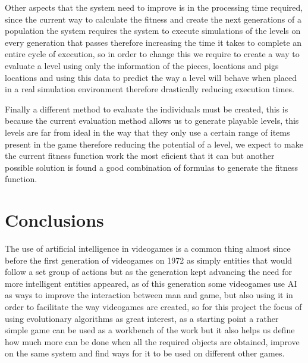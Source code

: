 \documentclass[conference]{IEEEtran}
\begin{document}
Other aspects that the system need to improve is in the processing time
required, since the current way to calculate the fitness and create the next
generations of a population the system requires the system to execute
simulations of the levels on every generation that passes therefore increasing
the time it takes to complete an entire cycle of execution, so in order to
change this we require to create a way to evaluate a level using only the
information of the pieces, locations and pigs locations and using this data to
predict the way a level will behave when placed in a real simulation environment
therefore drastically reducing execution times.

Finally a different method to evaluate the individuals must be created, this is
because the current evaluation method allows us to generate playable levels,
this levels are far from ideal in the way that they only use a certain range of
items present in the game therefore reducing the potential of a level, we expect
to make the current fitness function work the most eficient that it can but
another possible solution is found a good combination of formulas to generate
the fitness function.

\section{Conclusions}

The use of artificial intelligence in videogames is a common thing almost since
before the first generation of videogames on 1972 as simply entities that would
follow a set group of actions but as the generation kept advancing the need for
more intelligent entities appeared, as of this generation some videogames use AI
as ways to improve the interaction between man and game, but also using it in
order to facilitate the way videogames are created, so for this project the
focus of using evolutionary algorithms as great interest, as a starting point a
rather simple game can be used as a workbench of the work but it also helps us
define how much more can be done when all the required objects are obtained,
improve on the same system and find ways for it to be used on different other
games.

\printbibliography
\newrefcontext[sorting=ydnt]
\end{document}
